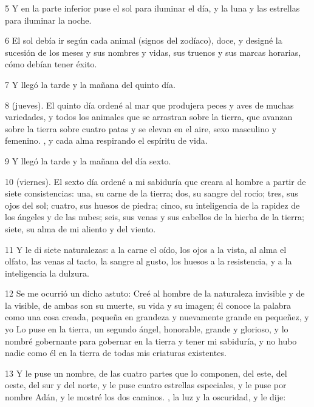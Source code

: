 \par 5 Y en la parte inferior puse el sol para iluminar el día, y la luna y las estrellas para iluminar la noche.

\par 6 El sol debía ir según cada animal (signos del zodíaco), doce, y designé la sucesión de los meses y sus nombres y vidas, sus truenos y sus marcas horarias, cómo debían tener éxito.

\par 7 Y llegó la tarde y la mañana del quinto día.

\par 8 (jueves). El quinto día ordené al mar que produjera peces y aves de muchas variedades, y todos los animales que se arrastran sobre la tierra, que avanzan sobre la tierra sobre cuatro patas y se elevan en el aire, sexo masculino y femenino. , y cada alma respirando el espíritu de vida.

\par 9 Y llegó la tarde y la mañana del día sexto.

\par 10 (viernes). El sexto día ordené a mi sabiduría que creara al hombre a partir de siete consistencias: una, su carne de la tierra; dos, su sangre del rocío; tres, sus ojos del sol; cuatro, sus huesos de piedra; cinco, su inteligencia de la rapidez de los ángeles y de las nubes; seis, sus venas y sus cabellos de la hierba de la tierra; siete, su alma de mi aliento y del viento.

\par 11 Y le di siete naturalezas: a la carne el oído, los ojos a la vista, al alma el olfato, las venas al tacto, la sangre al gusto, los huesos a la resistencia, y a la inteligencia la dulzura.

\par 12 Se me ocurrió un dicho astuto: Creé al hombre de la naturaleza invisible y de la visible, de ambas son su muerte, su vida y su imagen; él conoce la palabra como una cosa creada, pequeña en grandeza y nuevamente grande en pequeñez, y yo Lo puse en la tierra, un segundo ángel, honorable, grande y glorioso, y lo nombré gobernante para gobernar en la tierra y tener mi sabiduría, y no hubo nadie como él en la tierra de todas mis criaturas existentes.

\par 13 Y le puse un nombre, de las cuatro partes que lo componen, del este, del oeste, del sur y del norte, y le puse cuatro estrellas especiales, y le puse por nombre Adán, y le mostré los dos caminos. , la luz y la oscuridad, y le dije:

